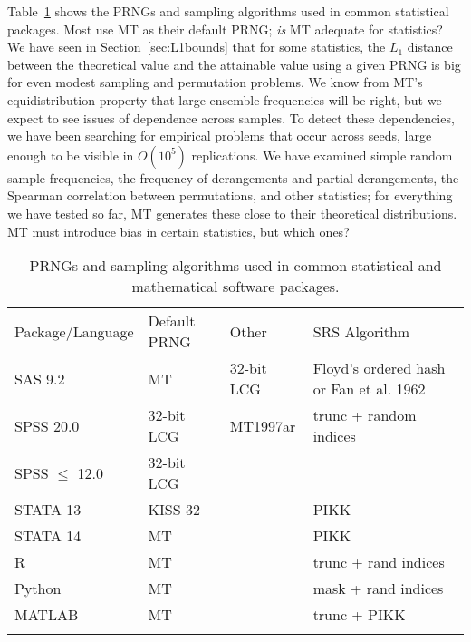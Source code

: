 \documentclass[graybox]{svmult}
\begin{document}
Table~\ref{tab:software} shows the PRNGs and sampling algorithms used in common statistical packages.
Most use MT as their default PRNG; \emph{is} MT adequate for statistics?
We have seen in Section~\ref{sec:L1bounds} that for some statistics, the $L_1$ distance between the theoretical value and the attainable value using a given PRNG
 is big for even modest sampling and permutation problems.
We know from MT's equidistribution property that large ensemble frequencies will be right, but we expect to see issues of dependence across samples.
To detect these dependencies, we have been searching for empirical problems that occur across seeds, large enough to be visible in $O(10^5)$ replications.
We have examined simple random sample frequencies, the frequency of derangements and partial derangements, the Spearman correlation between permutations, 
and other statistics;
for everything we have tested so far, MT generates these close to their theoretical distributions.
MT must introduce bias in certain statistics, but which ones?

\begin{table}
\caption{PRNGs and sampling algorithms used in common statistical and mathematical software packages.}
\label{tab:software}      
\begin{tabular}[h]{p{2.5cm}p{2.4cm}p{2.5cm}p{4cm}}
\hline\noalign{\smallskip}
Package/Language & Default PRNG & Other & SRS Algorithm  \\
\noalign{\smallskip}\svhline\noalign{\smallskip}
SAS 9.2              & MT         	& 32-bit LCG & Floyd's ordered hash or Fan et al. 1962 \\
SPSS 20.0          & 32-bit LCG  & MT1997ar  & trunc + random indices \\
SPSS $\le$ 12.0 & 32-bit LCG  &         &                \\
STATA 13            & KISS 32      &         & PIKK           \\
STATA 14            & MT              &         & PIKK           \\
R                         & MT              &         & trunc + rand indices \\
Python                 & MT             &         & mask + rand indices  \\
MATLAB              & MT             &         & trunc + PIKK         \\
\noalign{\smallskip}\hline\noalign{\smallskip}
\end{tabular}
\end{table}
\end{document}
